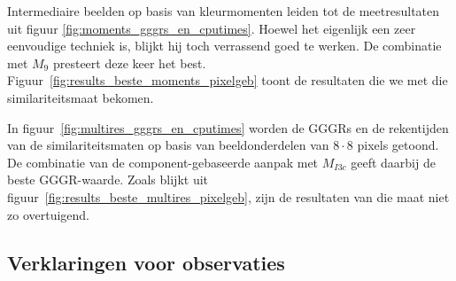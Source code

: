 Intermediaire beelden op basis van kleurmomenten leiden tot de meetresultaten uit 
figuur \ref{fig:moments_gggrs_en_cputimes}. Hoewel het eigenlijk een zeer eenvoudige
techniek is, blijkt hij toch verrassend goed te werken. De combinatie met $M_9$ presteert
deze keer het best. Figuur~\ref{fig:results_beste_moments_pixelgeb} toont de resultaten
die we met die similariteitsmaat bekomen.

In figuur~\ref{fig:multires_gggrs_en_cputimes} worden de GGGRs en de rekentijden van
de similariteitsmaten op basis van beeldonderdelen van $8 \cdot 8$ pixels getoond.
De combinatie van de component-gebaseerde aanpak met
$M_{I3c}$ geeft daarbij de beste GGGR-waarde. Zoals blijkt uit
figuur~\ref{fig:results_beste_multires_pixelgeb}, zijn de resultaten van die
maat niet zo overtuigend.

\subsection{Verklaringen voor observaties}

